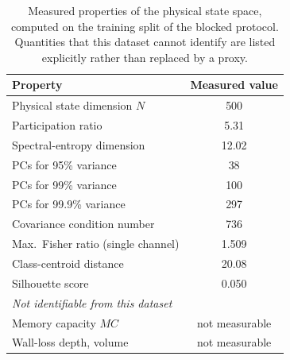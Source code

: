 \begin{table}[t]
\centering
\caption{Measured properties of the physical state space, computed on the training split of the blocked protocol. Quantities that this dataset cannot identify are listed explicitly rather than replaced by a proxy.}
\label{tab:reservoir}
\begin{tabular}{l c}
\toprule
\textbf{Property} & \textbf{Measured value} \\
\midrule
Physical state dimension $N$ & 500 \\
Participation ratio & 5.31 \\
Spectral-entropy dimension & 12.02 \\
PCs for 95\% variance & 38 \\
PCs for 99\% variance & 100 \\
PCs for 99.9\% variance & 297 \\
Covariance condition number & 736 \\
Max.\ Fisher ratio (single channel) & 1.509 \\
Class-centroid distance & 20.08 \\
Silhouette score & 0.050 \\
\midrule
\multicolumn{2}{l}{\textit{Not identifiable from this dataset}} \\
\midrule
Memory capacity $MC$ & not measurable \\
Wall-loss depth, volume & not measurable \\
\bottomrule
\end{tabular}
\end{table}
